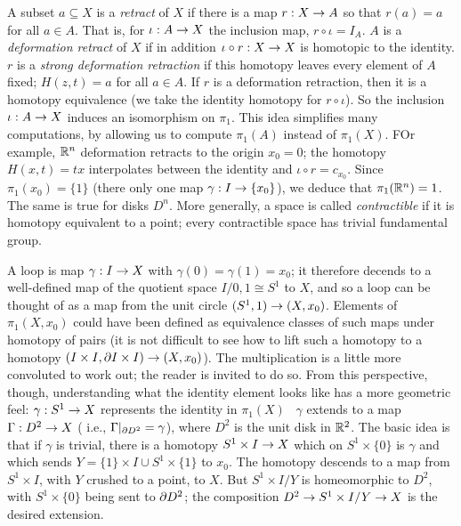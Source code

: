 \ssk

A subset $a\subseteq X$ is a {\it retract} of $X$ if there is a map $r:X\rightarrow A$ so 
that $r(a)=a$ for all $a\in A$. That is, for $\iota:A\rightarrow X$ the inclusion map,
$r\circ \iota = I_A$. $A$ is a {\it deformation retract} of $X$ if in addition
$\iota\circ r:X\rightarrow X$ is homotopic to the identity. $r$ is a {\it strong deformation
retraction} if this homotopy leaves every element of $A$ fixed; $H(z,t)=a$
for all $a\in A$. If $r$ is a deformation retraction, then it is a homotopy
equivalence (we take the identity homotopy for $r\circ \iota$). So the inclusion
$\iota:A\rightarrow X$ induces an isomorphism on $\pi_1$. This idea simplifies
many computations, by allowing us to compute $\pi_1(A)$ instead of 
$\pi_1(X)$. FOr example, ${\Bbb R}^n$ deformation retracts to the origin $x_0=0$;
the homotopy $H(x,t)=tx$ interpolates between the identity and $\iota\circ r=c_{x_0}$.
Since $\pi_1(x_0)=\{1\}$ (there  only one map $\gamma:I\rightarrow \{x_0\}$), 
we deduce that $\pi_1({\Bbb R}^n)=1$. The same is true for disks $D^n$. More generally,
a space is called {\it contractible} if it is homotopy equivalent to a point;
every contractible space has trivial fundamental group.

\msk

A loop is map $\gamma:I\rightarrow X$ with $\gamma(0)=\gamma(1)=x_0$; it therefore 
decends to a well-defined map of the quotient space $I/{0,1}\cong S^1$ to $X$,
and so a loop can be thought of as a map from the unit circle $(S^1,1)\rightarrow(X,x_0)$. Elements of
$\pi_1(X,x_0)$ could have been defined as equivalence classes of such maps
under homotopy of pairs (it is not difficult to see how to lift such a 
homotopy to a homotopy $(I\times I,\partial I\times I)\rightarrow (X,x_0)$). The 
multiplication is a little more convoluted to work out; the reader is 
invited to do so. From this perspective, though, understanding 
what the identity element looks like has a more geometric feel:
$\gamma:S^1\rightarrow X$ represents the identity in $\pi_1(X)$ \lra\
$\gamma$ extends to a map $\Gamma:D^2\rightarrow X$ ( i.e., $\Gamma|_{\partial D^2}=\gamma$),
where $D^2$ is the unit disk in ${\Bbb R}^2$. The basic idea is that if $\gamma$
is trivial, there is a homotopy $S^1\times I\rightarrow X$ which on $S^1\times \{0\}$ is
$\gamma$ and which sends $Y=\{1\}\times I\cup S^1\times \{1\}$ to $x_0$.
The homotopy descends to a map from $S^1\times I$, with $Y$ crushed to a point, to $X$.
But $S^1\times I/Y$ is homeomorphic to $D^2$, with $S^1\times\{0\}$ being sent to $\partial D^2$;
the composition $D^2\rightarrow S^1\times I/Y\rightarrow X$ is the desired extension.

